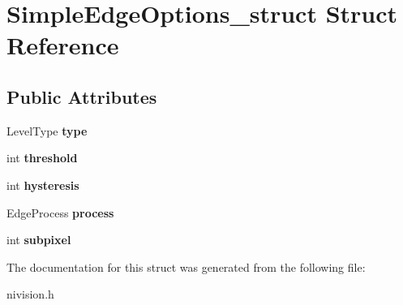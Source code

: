 \hypertarget{structSimpleEdgeOptions__struct}{\section{\-Simple\-Edge\-Options\-\_\-struct \-Struct \-Reference}
\label{structSimpleEdgeOptions__struct}
}
\subsection*{\-Public \-Attributes}
\begin{DoxyCompactItemize}
\item 
\hypertarget{structSimpleEdgeOptions__struct_a4993636d89f092008cfd22e8f34c21e3}{\-Level\-Type {\bfseries type}}\label{structSimpleEdgeOptions__struct_a4993636d89f092008cfd22e8f34c21e3}

\item 
\hypertarget{structSimpleEdgeOptions__struct_a2c5582eddc42bc325657bd5ebb6c5e9e}{int {\bfseries threshold}}\label{structSimpleEdgeOptions__struct_a2c5582eddc42bc325657bd5ebb6c5e9e}

\item 
\hypertarget{structSimpleEdgeOptions__struct_ac844280f0cf0dd41160228c38c3a5ae1}{int {\bfseries hysteresis}}\label{structSimpleEdgeOptions__struct_ac844280f0cf0dd41160228c38c3a5ae1}

\item 
\hypertarget{structSimpleEdgeOptions__struct_a504362d6176ae043f255798f919007b3}{\-Edge\-Process {\bfseries process}}\label{structSimpleEdgeOptions__struct_a504362d6176ae043f255798f919007b3}

\item 
\hypertarget{structSimpleEdgeOptions__struct_a5bd7b1763aefd7a2a2c9394562bfe63c}{int {\bfseries subpixel}}\label{structSimpleEdgeOptions__struct_a5bd7b1763aefd7a2a2c9394562bfe63c}

\end{DoxyCompactItemize}


\-The documentation for this struct was generated from the following file\-:\begin{DoxyCompactItemize}
\item 
nivision.\-h\end{DoxyCompactItemize}

